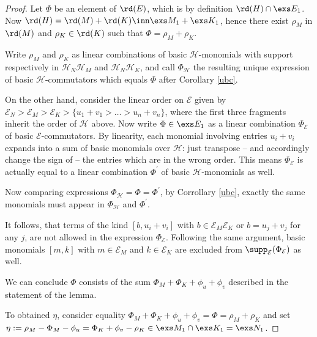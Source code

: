 \begin{proof}
Let $\Phi$ be an element of $\rd(E)$, which is by definition $\rd(H)\cap\exs E_{1}$. Now $\rd(H)=\rd(M)+\rd(K)\inn
\exs M_{1}+\exs K_{1}$, hence there exist $\rho_{M}$ in $\rd(M)$ and $\rho_{K}\in \rd(K)$ such that $\Phi=\rho_{M}+\rho_{K}$.

Write $\rho_{M}$ and $\rho_{K}$ as linear combinations of basic $\mathcal{H}$-monomials with support respectively in $\mathcal{H}_{N}\mathcal{H}_{M}$ and $\mathcal{H}_{N}\mathcal{H}_{K}$, and call $\Phi_{\mathcal{H}}$ the resulting unique expression
of basic $\mathcal{H}$-commutators which equals $\Phi$ after Corollary \ref{ubc}.

\smallskip
On the other hand, consider the linear order on $\mathcal{E}$ given by $\mathcal{E}_{N}>\mathcal{E}_{M}>\mathcal{E}_{K}>
\{u_{1}+v_{1}>\dots>u_{n}+v_{n}\}$, where the first three fragments inherit the order of $\mathcal{H}$ above.
Now write $\Phi\in\exs E_{1}$ as a linear combination $\Phi_{\mathcal{E}}$ of basic $\mathcal{E}$-commutators.
By linearity, each monomial %
involving entries $u_{i}+v_{i}$ expands into a sum of 
basic monomials over $\mathcal{H}$: just transpose -- and accordingly change the sign of -- the entries which are in the wrong order. 
This means $\Phi_{\mathcal{E}}$ is actually equal to a linear combination $\Phi^{\prime}$ of
basic $\mathcal{H}$-monomials as well.

Now comparing expressions $\Phi_{\mathcal{H}}=\Phi=\Phi^{\prime}$, by Corrollary \ref{ubc},
exactly the same monomials must appear in $\Phi_{\mathcal{H}}$ and $\Phi^{\prime}$.

It follows, that terms of the kind
$[b,u_{i}+v_{i}]$ with $b\in\mathcal{E}_{M}\mathcal{E}_{K}$ or $b=u_{j}+v_{j}$ for any $j$, are not allowed
in the expression $\Phi_{\mathcal{E}}$. Following the same
argument, basic monomials $[m,k]$ with $m\in\mathcal{E}_{M}$ and $k\in\mathcal{E}_{K}$ are excluded from $\supp_{\mathcal{E}}
(\Phi_{\mathcal{E}})$ as well.

We can conclude $\Phi$ consists of the sum $\Phi_{M}+\Phi_{K}+\phi_{u}+\phi_{v}$ described in the statement of the lemma.

To obtained $\eta$, consider equality $\Phi_{M}+\Phi_{K}+\phi_{u}+\phi_{v}=\Phi=\rho_{M}+\rho_{K}$ and set
$\eta:=\rho_{M}-\Phi_{M}-\phi_{u}=\Phi_{K}+\phi_{v}-\rho_{K}
\in\exs M_{1}\cap\exs K_{1}=\exs N_{1}$.
\end{proof}

